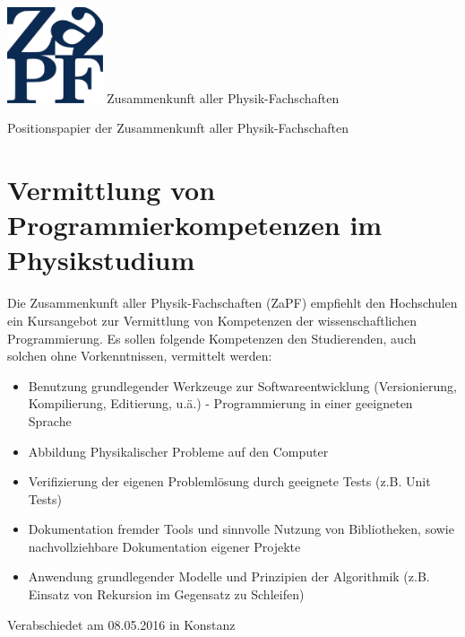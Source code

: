 \documentclass[DIV=calc]{scrartcl}
\begin{document}
\hspace{0.87\textwidth}
\begin{minipage}{120pt}
\vspace{-1.8cm}
\includegraphics[width=80pt]{logo.pdf}
\centering
\small Zusammenkunft aller Physik-Fachschaften
\end{minipage}
\begin{center}
\huge{Positionspapier der Zusammenkunft aller Physik-Fachschaften} \\
\normalsize
\end{center}

\vspace{1cm}
\section*{Vermittlung von Programmierkompetenzen im Physikstudium}

Die Zusammenkunft aller Physik-Fachschaften (ZaPF) empfiehlt den Hochschulen ein  Kursangebot zur Vermittlung von Kompetenzen der wissenschaftlichen Programmierung. Es sollen folgende Kompetenzen den Studierenden, auch solchen ohne Vorkenntnissen, vermittelt werden:
\begin{itemize}
\item Benutzung grundlegender Werkzeuge zur Softwareentwicklung (Versionierung, Kompilierung, Editierung, u.ä.) - Programmierung in einer geeigneten Sprache
\item Abbildung Physikalischer Probleme auf den Computer
\item Verifizierung der eigenen Problemlösung durch geeignete Tests (z.B. Unit Tests)
\item Dokumentation fremder Tools und sinnvolle Nutzung von Bibliotheken, sowie nachvollziehbare Dokumentation eigener Projekte
\item Anwendung grundlegender Modelle und Prinzipien der Algorithmik (z.B. Einsatz von Rekursion im Gegensatz zu Schleifen)
\end{itemize}


\vfill
\begin{flushright}
Verabschiedet am 08.05.2016 in Konstanz
\end{flushright}
\end{document}
